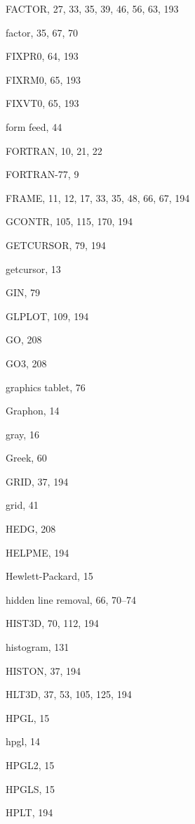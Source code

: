 \begin{theindex}
  \indexspace

  \item FACTOR, 27, 33, 35, 39, 46, 56, 63, 193
  \item factor, 35, 67, 70
  \item FIXPR0, 64, 193
  \item FIXRM0, 65, 193
  \item FIXVT0, 65, 193
  \item form feed, 44
  \item FORTRAN, 10, 21, 22
  \item FORTRAN-77, 9
  \item FRAME, 11, 12, 17, 33, 35, 48, 66, 67, 194

  \indexspace

  \item GCONTR, 105, 115, 170, 194
  \item GETCURSOR, 79, 194
  \item getcursor, 13
  \item GIN, 79
  \item GLPLOT, 109, 194
  \item GO, 208
  \item GO3, 208
  \item graphics tablet, 76
  \item Graphon, 14
  \item gray, 16
  \item Greek, 60
  \item GRID, 37, 194
  \item grid, 41

  \indexspace

  \item HEDG, 208
  \item HELPME, 194
  \item Hewlett-Packard, 15
  \item hidden line removal, 66, 70--74
  \item HIST3D, 70, 112, 194
  \item histogram, 131
  \item HISTON, 37, 194
  \item HLT3D, 37, 53, 105, 125, 194
  \item HPGL, 15
  \item hpgl, 14
  \item HPGL2, 15
  \item HPGLS, 15
  \item HPLT, 194

  \indexspace


\end{theindex}
